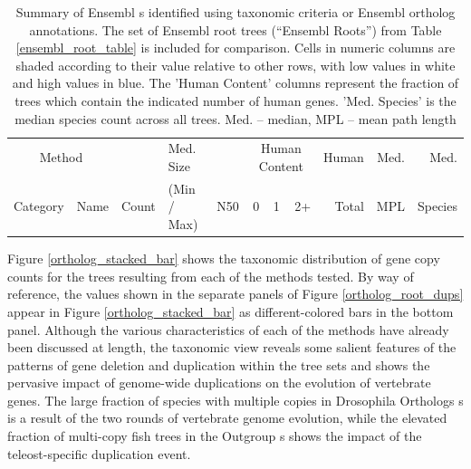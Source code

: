 \begin{landscape}
\begin{table}[ht]
\centering
\begin{tabular}{llrb{2.5cm}rrrrrrr}
\toprule
\multicolumn{2}{c}{Method} & &  Med. Size &  & \multicolumn{3}{c}{Human Content} & Human & Med. & Med. \\ \cmidrule(r){6-8} \cmidrule(r){1-2}
Category & Name & Count  & (Min / Max) & N50 & 0 & 1 & 2+ & Total & MPL & Species \\ 
  \midrule

\bottomrule
\end{tabular}
\caption{Summary of Ensembl \subtr{}s identified using taxonomic
  criteria or Ensembl ortholog annotations. The set of Ensembl root
  trees (``Ensembl Roots'') from Table \ref{ensembl_root_table} is
  included for comparison. Cells in numeric columns are shaded
  according to their value relative to other rows, with low values in
  white and high values in blue. The 'Human Content' columns represent
  the fraction of trees which contain the indicated number of human
  genes. 'Med. Species' is the median species count across all
  trees. Med. -- median, MPL -- mean path length}
\label{ensembl_subtree_table}
\end{table}
\end{landscape}

Figure \ref{ortholog_stacked_bar} shows the taxonomic distribution of
gene copy counts for the trees resulting from each of the \subtr
methods tested. By way of reference, the values shown in the separate
panels of Figure \ref{ortholog_root_dups} appear in Figure
\ref{ortholog_stacked_bar} as different-colored bars in the bottom
panel. Although the various characteristics of each of the \subtr
methods have already been discussed at length, the taxonomic view
reveals some salient features of the patterns of gene deletion and
duplication within the tree sets and shows the pervasive impact of
genome-wide duplications on the evolution of vertebrate genes. The
large fraction of species with multiple copies in Drosophila Orthologs
\subtr{}s is a result of the two rounds of vertebrate genome
evolution, while the elevated fraction of multi-copy fish trees in the
Outgroup \subtr{}s shows the impact of the teleost-specific
duplication event.

